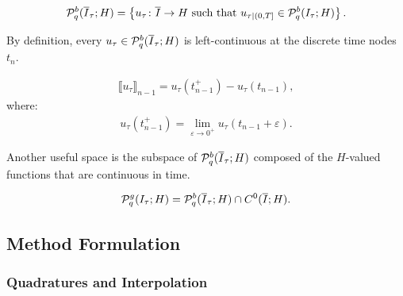\begin{definition}
    \begin{gather}
        \mathcal{P}_{q}^b(\overline{I}_{\tau}; H) = \left\{ u_{\tau} \colon \overline{I} \rightarrow H \text{ such that } u_{\tau \mid (0, T]} \in \mathcal{P}_{q}^b(I_{\tau}; H) \right\}.
    \end{gather}
\end{definition}


By definition, every $u_{\tau} \in \mathcal{P}_{q}^b(\overline{I}_{\tau}; H)$ is left-continuous at the discrete time nodes $t_n$.

\begin{definition}
    \begin{gather}
        \llbracket u_{\tau} \rrbracket_{n - 1} = u_{\tau}(t_{n - 1}^+) - u_{\tau}(t_{n - 1}),
    \end{gather}
    where:
    \begin{gather}
        u_{\tau}(t_{n - 1}^+) = \lim_{\varepsilon \rightarrow 0^+} u_{\tau}(t_{n - 1} + \varepsilon).
    \end{gather}
\end{definition}

Another useful space is the subspace of $\mathcal{P}_{q}^b(\overline{I}_{\tau}; H)$ composed of the $H$-valued functions that are continuous in time.

\begin{definition}
    \begin{gather}
        \mathcal{P}_{q}^g(I_{\tau}; H) = \mathcal{P}_{q}^b(\overline{I}_{\tau}; H) \cap C^0(\overline{I}; H).
    \end{gather}
\end{definition}

\newpage
\subsection{Method Formulation}

\subsubsection{Quadratures and Interpolation}

